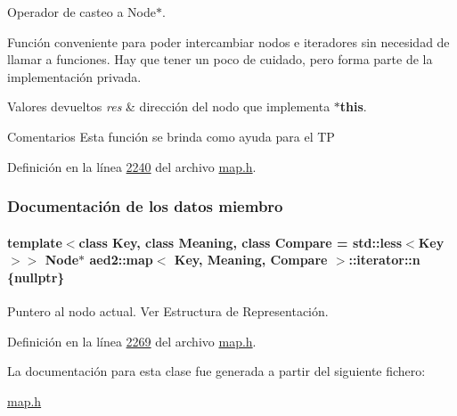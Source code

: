 Operador de casteo a Node$\ast$. 

Función conveniente para poder intercambiar nodos e iteradores sin necesidad de llamar a funciones. Hay que tener un poco de cuidado, pero forma parte de la implementación privada.


\begin{DoxyRetVals}{Valores devueltos}
{\em res} & dirección del nodo que implementa {\bfseries $\ast$this}.\\
\hline
\end{DoxyRetVals}
\begin{DoxyRemark}{Comentarios}
Esta función se brinda como ayuda para el TP 
\end{DoxyRemark}


Definición en la línea \hyperlink{map_8h_source_l02240}{2240} del archivo \hyperlink{map_8h_source}{map.\+h}.



\subsubsection{Documentación de los datos miembro}
\paragraph[{\texorpdfstring{n}{n}}]{\setlength{\rightskip}{0pt plus 5cm}template$<$class Key, class Meaning, class Compare = std\+::less$<$\+Key$>$$>$ Node$\ast$ {\bf aed2\+::map}$<$ Key, Meaning, Compare $>$\+::iterator\+::n \{nullptr\}\hspace{0.3cm}{\ttfamily [private]}}\hypertarget{classaed2_1_1map_1_1iterator_adf8633ef71bb6c1fc01c0abe8728fd93_adf8633ef71bb6c1fc01c0abe8728fd93}{}\label{classaed2_1_1map_1_1iterator_adf8633ef71bb6c1fc01c0abe8728fd93_adf8633ef71bb6c1fc01c0abe8728fd93}


Puntero al nodo actual. Ver Estructura de Representación. 



Definición en la línea \hyperlink{map_8h_source_l02269}{2269} del archivo \hyperlink{map_8h_source}{map.\+h}.



La documentación para esta clase fue generada a partir del siguiente fichero\+:\begin{DoxyCompactItemize}
\item 
\hyperlink{map_8h}{map.\+h}\end{DoxyCompactItemize}
